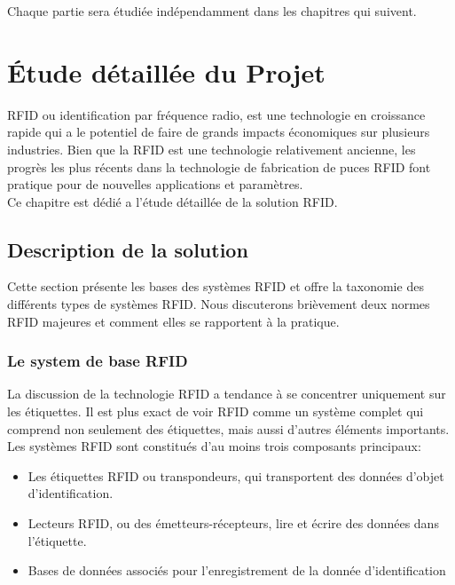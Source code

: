 \documentclass[11pt, a4paper, twoside]{book}
\begin{document}
Chaque partie sera étudiée indépendamment dans les chapitres qui suivent.

\chapter{Étude	détaillée du Projet}
RFID ou identification par fréquence radio, est une technologie en croissance rapide qui a le potentiel de faire de grands impacts économiques sur plusieurs industries. Bien que la RFID est une technologie relativement ancienne, les progrès les plus récents dans la technologie de fabrication de puces RFID font pratique pour de nouvelles applications et paramètres.\\
Ce chapitre est dédié a l'étude	 détaillée de la solution RFID.
\section{Description de la solution}
Cette section présente les bases des systèmes RFID et offre la taxonomie des différents types de systèmes RFID. Nous discuterons brièvement deux normes RFID majeures et comment elles se rapportent à la pratique.
\subsection{Le system de base RFID}
La discussion de la technologie RFID a tendance à se concentrer uniquement sur les étiquettes. Il est plus exact de voir RFID comme un système complet qui comprend non seulement des étiquettes, mais aussi d'autres éléments importants. Les systèmes RFID sont constitués d'au moins trois composants principaux:
\begin{itemize}
\item Les étiquettes RFID ou transpondeurs, qui transportent des données d'objet d'identification.
\item Lecteurs RFID, ou des émetteurs-récepteurs, lire et écrire des données dans l'étiquette.
\item Bases de données associés pour l'enregistrement de la donnée d'identification\\
\end{itemize}
\end{document}
